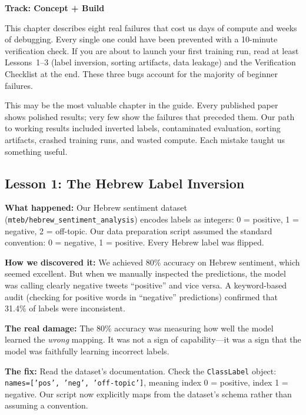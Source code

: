 \documentclass[11pt,a4paper]{article}
\begin{document}
\begin{center}
\colorbox{lightaccent}{\textbf{Track: Concept + Build}}
\end{center}

\begin{warning}[title={Read This Before Your First Training Run}]
This chapter describes eight real failures that cost us days of compute and weeks of debugging. Every single one could have been prevented with a 10-minute verification check. If you are about to launch your first training run, read at least Lessons~1--3 (label inversion, sorting artifacts, data leakage) and the Verification Checklist at the end. These three bugs account for the majority of beginner failures.
\end{warning}

This may be the most valuable chapter in the guide. Every published paper shows polished results; very few show the failures that preceded them. Our path to working results included inverted labels, contaminated evaluation, sorting artifacts, crashed training runs, and wasted compute. Each mistake taught us something useful.

\subsection{Lesson 1: The Hebrew Label Inversion}

\textbf{What happened:} Our Hebrew sentiment dataset (\texttt{mteb/hebrew\_sentiment\_analysis}) encodes labels as integers: 0 = positive, 1 = negative, 2 = off-topic. Our data preparation script assumed the standard convention: 0 = negative, 1 = positive. Every Hebrew label was flipped.

\textbf{How we discovered it:} We achieved 80\% accuracy on Hebrew sentiment, which seemed excellent. But when we manually inspected the predictions, the model was calling clearly negative tweets ``positive'' and vice versa. A keyword-based audit (checking for positive words in ``negative'' predictions) confirmed that 31.4\% of labels were inconsistent.

\textbf{The real damage:} The 80\% accuracy was measuring how well the model learned the \emph{wrong} mapping. It was not a sign of capability---it was a sign that the model was faithfully learning incorrect labels.

\textbf{The fix:} Read the dataset's documentation. Check the \texttt{ClassLabel} object: \texttt{names=['pos', 'neg', 'off-topic']}, meaning index 0 = positive, index 1 = negative. Our script now explicitly maps from the dataset's schema rather than assuming a convention.
\end{document}
